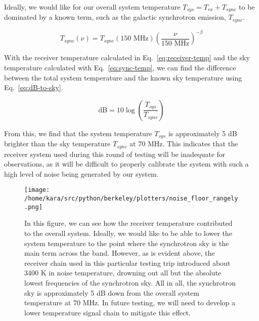 \documentclass[11pt]{article}
\begin{document}
Ideally, we would like for our overall system temperature $T_{sys} = T_{rx} + 
T_{sync}$ to be dominated by a known term, such as the galactic synchrotron 
emission, $T_{sync}$.  

\begin{equation}
    \label{eq:sync-temp}
    T_{sync}(\nu) = T_{sync}(\textrm{150 MHz}) \left(\frac{\nu}{\textrm{150 
    MHz}}\right)^{-\beta}
\end{equation}

With the receiver temperature calculated in Eq.~\eqref{eq:receiver-temp} and 
the sky temperature calculated with Eq.~\eqref{eq:sync-temp}, we can find the 
difference between the total system temperature and the known sky temperature 
using Eq.~\eqref{eq:dB-to-sky}.

\begin{equation}
    \label{eq:dB-to-sky}
    \textrm{dB} = 10 \log\left(\frac{T_{sys}}{T_{sync}}\right)
\end{equation}

From this, we find that the system temperature $T_{sys}$ is approximately 5 dB 
brighter than the sky temperature $T_{sync}$ at 70 MHz. This indicates that the 
receiver system used during this round of testing will be inadequate for 
observations, as it will be difficult to properly calibrate the system with 
such a high level of noise being generated by our system.

\begin{figure}
    \begin{center}
    \texttt{[image: /home/kara/src/python/berkeley/plotters/noise\_floor\_rangely.png]}
    \end{center}
    \caption{
        In this figure, we can see how the receiver temperature contributed to 
        the overall system. Ideally, we would like to be able to lower the 
        system temperature to the point where the synchrotron sky is the main 
        term across the band. However, as is evident above, the receiver chain 
        used in this particular testing trip introduced about 3400 K in noise 
        temperature, drowning out all but the absolute lowest frequencies of 
        the synchrotron sky. All in all, the synchrotron sky is approximately 5 
        dB down from the overall system temperature at 70 MHz.  In future 
        testing, we will need to develop a lower temperature signal chain to 
        mitigate this effect.
    }
    \label{fig:noise-floor}
\end{figure}
\end{document}
